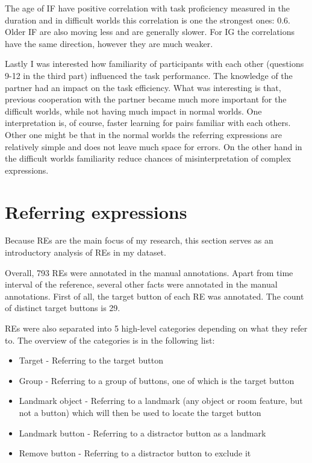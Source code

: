 The age of IF have positive correlation with task proficiency measured in the duration and in difficult worlds this correlation is one the strongest ones: 0.6. Older IF are also moving less and are generally slower. For IG the correlations have the same direction, however they are much weaker.

Lastly I was interested how familiarity of participants with each other (questions 9-12 in the third part) influenced the task performance. The knowledge of the partner had an impact on the task efficiency. What was interesting is that, previous cooperation with the partner became much more important for the difficult worlds, while not having much impact in normal worlds. One interpretation is, of course, faster learning for pairs familiar with each others. Other one might be that in the normal worlds the referring expressions are relatively simple and does not leave much space for errors. On the other hand in the difficult worlds familiarity reduce chances of misinterpretation of complex expressions.

\section{Referring expressions}
Because REs are the main focus of my research, this section serves as an introductory analysis of REs in my dataset.

Overall, 793 REs were annotated in the manual annotations. Apart from time interval of the reference, several other facts were annotated in the manual annotations. First of all, the target button of each RE was annotated. The count of distinct target buttons is 29.  

REs were also separated into 5 high-level categories depending on what they refer to. The  overview of the categories is in the following list:

\begin{itemize}
\item
Target - Referring to the target button
\item
Group - Referring to a group of buttons, one of which is the target button
\item
Landmark object - Referring to a landmark (any object or room feature, but not a button) which will then be used to locate the target button
\item
Landmark button - Referring to a distractor button as a landmark
\item
Remove button -  Referring to a distractor button to exclude it
\end{itemize}

